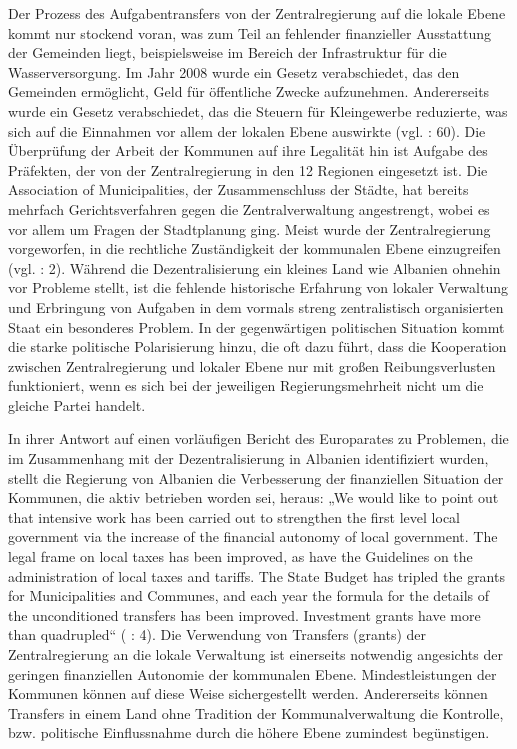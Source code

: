 Der Prozess des Aufgabentransfers von der Zentralregierung auf die lokale Ebene kommt nur stockend voran, was zum Teil an fehlender finanzieller Ausstattung der Gemeinden liegt, beispielsweise im Bereich der Infrastruktur für die Wasserversorgung. Im Jahr 2008 wurde ein Gesetz verabschiedet, das den Gemeinden ermöglicht, Geld für öffentliche Zwecke aufzunehmen. Andererseits wurde ein Gesetz verabschiedet, das die Steuern für Kleingewerbe reduzierte, was sich auf die Einnahmen vor allem der lokalen Ebene auswirkte (vgl. \cite{refworld10} : 60). Die Überprüfung der Arbeit der Kommunen auf ihre Legalität hin ist Aufgabe des Präfekten, der von der Zentralregierung in den 12 Regionen eingesetzt ist. Die Association of Municipalities, der Zusammenschluss der Städte, hat bereits mehrfach Gerichtsverfahren gegen die Zentralverwaltung angestrengt, wobei es vor allem um Fragen der Stadtplanung ging. Meist wurde der Zentralregierung vorgeworfen, in die rechtliche Zuständigkeit der kommunalen Ebene einzugreifen (vgl. \cite{oecd08a} : 2). Während die Dezentralisierung ein kleines Land wie Albanien ohnehin vor Probleme stellt, ist die fehlende historische Erfahrung von lokaler Verwaltung und Erbringung von Aufgaben in dem vormals streng zentralistisch organisierten Staat ein besonderes Problem. In der gegenwärtigen politischen Situation kommt die starke politische Polarisierung hinzu, die oft dazu führt, dass die Kooperation zwischen Zentralregierung und lokaler Ebene nur mit großen Reibungsverlusten funktioniert, wenn es sich bei der jeweiligen Regierungsmehrheit nicht um die gleiche Partei handelt.\par
In ihrer Antwort auf einen vorläufigen Bericht des Europarates zu Problemen, die im Zusammenhang mit der Dezentralisierung in Albanien identifiziert wurden, stellt die Regierung von Albanien die Verbesserung der finanziellen Situation der Kommunen, die aktiv betrieben worden sei, heraus: „We would like to point out that intensive work has been carried out to strengthen the first level local government via the increase of the financial autonomy of local government. The legal frame on local taxes has been improved, as have the Guidelines on the administration of local taxes and tariffs. The State Budget has tripled the grants for Municipalities and Communes, and each year the formula for the details of the unconditioned transfers has been improved. Investment grants have more than quadrupled“ (\cite{govalb09} : 4). Die Verwendung von Transfers (grants) der Zentralregierung an die lokale Verwaltung ist einerseits notwendig angesichts der geringen finanziellen Autonomie der kommunalen Ebene. Mindestleistungen der Kommunen können auf diese Weise sichergestellt werden. Andererseits können Transfers in einem Land ohne Tradition der Kommunalverwaltung die Kontrolle, bzw. politische Einflussnahme durch die höhere Ebene zumindest begünstigen. \par 
